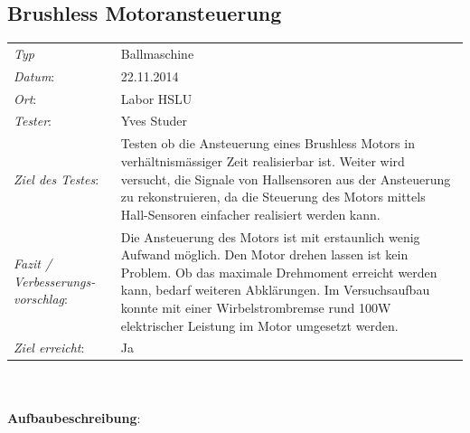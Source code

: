 \subsection{Brushless Motoransteuerung}

\begin{tabular}{p{3.6cm}p{9.4cm}}
\textit{Typ}              & Ballmaschine\\ 
\textit{Datum}:           & 22.11.2014\\
\textit{Ort}:             & Labor HSLU\\
\textit{Tester}:          & Yves Studer\\
\textit{Ziel des Testes}: & Testen ob die Ansteuerung eines Brushless Motors in verhältnismässiger Zeit realisierbar ist. Weiter wird versucht, die Signale von Hallsensoren aus der Ansteuerung zu rekonstruieren, da die Steuerung des Motors mittels Hall-Sensoren einfacher realisiert werden kann.\\
\textit{Fazit / Verbesserungs-\newline vorschlag}: & Die Ansteuerung des Motors ist mit erstaunlich wenig Aufwand möglich. Den Motor drehen lassen ist kein Problem. Ob das maximale Drehmoment erreicht werden kann, bedarf weiteren Abklärungen. Im Versuchsaufbau konnte mit einer Wirbelstrombremse rund 100W elektrischer Leistung im Motor umgesetzt werden. \\ 
\textit{Ziel erreicht}:& Ja\\
\end{tabular}\\
\\
\textbf{Aufbaubeschreibung}:
